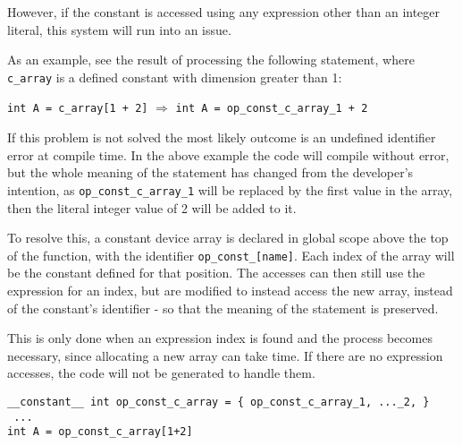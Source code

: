 However, if the constant is accessed using any expression other than an integer literal, this system will run into an issue.
\par As an example, see the result of processing the following statement, where \verb|c_array| is a defined constant with dimension greater than 1:
\begin{center}
\lstinline|int A = c_array[1 + 2]| \hspace{1cm}$\Rightarrow$\hspace{1cm} \lstinline |int A = op_const_c_array_1 + 2|
\end{center}

If this problem is not solved the most likely outcome is an undefined identifier error at compile time. In the above example the code will compile without error, but the whole meaning of the statement has changed from the developer's intention, as \verb|op_const_c_array_1| will be replaced by the first value in the array, then the literal integer value of 2 will be added to it.
\par
To resolve this, a constant device array is declared in global scope above the top of the function, with the identifier \verb|op_const_[name]|. Each index of the array will be the constant defined for that position. The accesses can then still use the expression for an index, but are modified to instead access the new array, instead of the constant's identifier - so that the meaning of the statement is preserved.
\par This is only done when an expression index is found and the process becomes necessary, since allocating a new array can take time. If there are no expression accesses, the code will not be generated to handle them.\\
\begin{lstlisting}[backgroundcolor=\color{green!20}]
__constant__ int op_const_c_array = { op_const_c_array_1, ..._2, }
 ...
int A = op_const_c_array[1+2]
\end{lstlisting}

